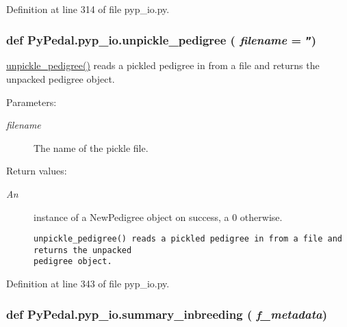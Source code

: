 Definition at line 314 of file pyp\_\-io.py.\hypertarget{namespacePyPedal_1_1pyp__io_4a365d51c03b525a0428c653d74d3ee7}{
\subsubsection[unpickle\_\-pedigree]{\setlength{\rightskip}{0pt plus 5cm}def Py\-Pedal.pyp\_\-io.unpickle\_\-pedigree ( {\em filename} = {\tt ''})}}
\label{namespacePyPedal_1_1pyp__io_4a365d51c03b525a0428c653d74d3ee7}


\hyperlink{namespacePyPedal_1_1pyp__io_4a365d51c03b525a0428c653d74d3ee7}{unpickle\_\-pedigree()} reads a pickled pedigree in from a file and returns the unpacked pedigree object. 

\begin{Desc}
\item[Parameters:]
\begin{description}
\item[{\em filename}]The name of the pickle file. \end{description}
\end{Desc}
\begin{Desc}
\item[Return values:]
\begin{description}
\item[{\em An}]instance of a New\-Pedigree object on success, a 0 otherwise.

\footnotesize\begin{verbatim}unpickle_pedigree() reads a pickled pedigree in from a file and returns the unpacked
pedigree object.
\end{verbatim}
\normalsize
 \end{description}
\end{Desc}


Definition at line 343 of file pyp\_\-io.py.\hypertarget{namespacePyPedal_1_1pyp__io_3f2dc00cc32ac2b15474f5dbca14adf5}{
\subsubsection[summary\_\-inbreeding]{\setlength{\rightskip}{0pt plus 5cm}def Py\-Pedal.pyp\_\-io.summary\_\-inbreeding ( {\em f\_\-metadata})}}
\label{namespacePyPedal_1_1pyp__io_3f2dc00cc32ac2b15474f5dbca14adf5}


